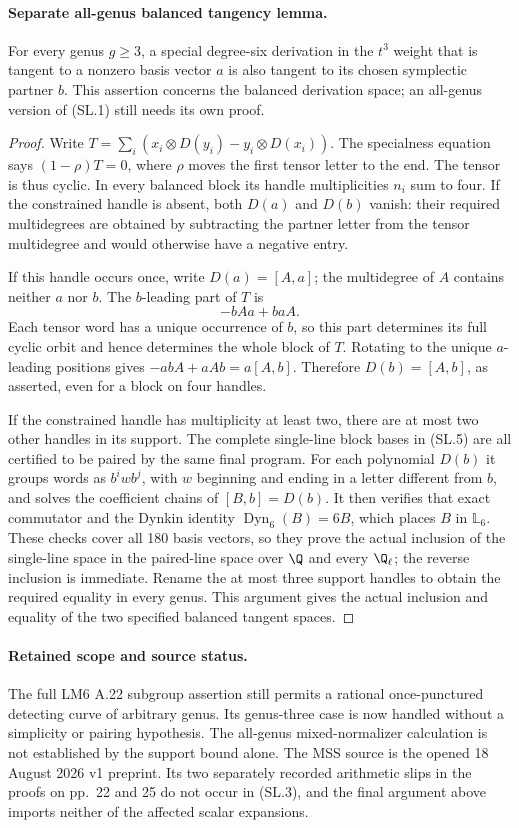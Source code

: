 \paragraph{Separate all-genus balanced tangency lemma.}
For every genus $g\geq3$, a special degree-six derivation in
the $t^3$ weight that is tangent to a nonzero basis vector
$a$ is also tangent to its chosen symplectic partner $b$.
This assertion concerns the balanced derivation space; an
all-genus version of (SL.1) still needs its own proof.

\begin{proof}
Write $T=\sum_i(x_i\otimes D(y_i)-y_i\otimes D(x_i))$.
The specialness equation says $(1-\rho)T=0$, where $\rho$
moves the first tensor letter to the end. The tensor is thus
cyclic. In every balanced block its handle multiplicities
$n_i$ sum to four. If the constrained handle is absent,
both $D(a)$ and $D(b)$ vanish: their required multidegrees
are obtained by subtracting the partner letter from the
tensor multidegree and would otherwise have a negative entry.

If this handle occurs once, write $D(a)=[A,a]$; the
multidegree of $A$ contains neither $a$ nor $b$. The
$b$-leading part of $T$ is
\[
                      -bAa+baA.
\]
Each tensor word has a unique occurrence of $b$, so this
part determines its full cyclic orbit and hence determines
the whole block of $T$. Rotating to the unique $a$-leading
positions gives $-abA+aAb=a[A,b]$. Therefore
$D(b)=[A,b]$, as asserted, even for a block on four handles.

If the constrained handle has multiplicity at least two,
there are at most two other handles in its support. The
complete single-line block bases in (SL.5) are all
certified to be paired by the same final program.
For each polynomial $D(b)$ it groups words as
$b^i w b^j$, with $w$ beginning and ending in a letter
different from $b$, and solves the coefficient chains of
$[B,b]=D(b)$. It then verifies that exact commutator and
the Dynkin identity $\operatorname{Dyn}_6(B)=6B$, which
places $B$ in $\mathbb L_6$. These checks cover all 180
basis vectors, so they prove the actual inclusion of the
single-line space in the paired-line space over $\Q$ and
every $\Q_\ell$; the reverse inclusion is immediate.
Rename the at most three support
handles to obtain the required equality in every genus.
This argument gives the actual inclusion and equality of
the two specified balanced tangent spaces.
\end{proof}

\paragraph{Retained scope and source status.}
The full LM6 A.22 subgroup assertion still permits a rational
once-punctured detecting curve of arbitrary genus. Its genus-three
case is now handled without a simplicity or pairing hypothesis.
The all-genus mixed-normalizer calculation is not established
by the support bound alone. The MSS source is the opened
18 August 2026 v1 preprint. Its two separately recorded arithmetic
slips in the proofs on pp.~22 and 25 do not occur in (SL.3),
and the final argument above imports neither of the affected
scalar expansions.
